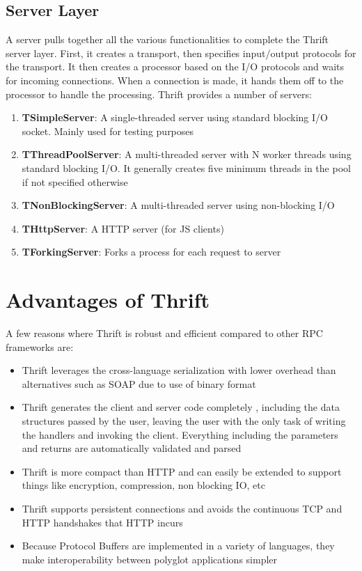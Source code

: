 \documentclass[9pt,twocolumn,twoside]{../../styles/osajnl}
\begin{document}
\subsection{Server Layer}	
A server pulls together all the various functionalities to complete the Thrift server layer. First, it creates a transport, then specifies input/output protocols for the transport. It then creates a processor based on the I/O protocols and waits for incoming connections. When a connection is made, it hands them off to the processor to handle the processing. Thrift provides a number of servers:
\begin{enumerate}
	\item \textbf{TSimpleServer}: A single-threaded server using standard blocking I/O socket. Mainly used for testing purposes
	\item \textbf{TThreadPoolServer}: A multi-threaded server with N worker threads using standard blocking I/O. It generally creates five minimum threads in the pool if not specified otherwise
	\item \textbf{TNonBlockingServer}: A multi-threaded server using non-blocking I/O
	\item \textbf{THttpServer}: A HTTP server (for JS clients)
	\item \textbf{TForkingServer}: Forks a process for each request to server\\
\end{enumerate}


\section{Advantages of Thrift}
A few reasons where Thrift is robust and efficient compared to other RPC frameworks are:
\begin{itemize}
\item Thrift leverages the cross-language serialization with lower overhead than alternatives such as SOAP due to use of binary format
\item Thrift generates the client and server code completely \cite{www-thrift-tutorial}, including the data structures passed by the user, leaving the user with the only task of writing the handlers and invoking the client. Everything including the parameters and returns are automatically validated and parsed
\item Thrift is more compact than HTTP and can easily be extended to support things like encryption, compression, non blocking IO, etc
\item Thrift supports persistent connections and avoids the continuous TCP and HTTP handshakes that HTTP incurs
\item Because Protocol Buffers \cite{www-protocol-buffers} are implemented in a variety of languages, they make interoperability between polyglot applications simpler\\
\end{itemize}
\end{document}
